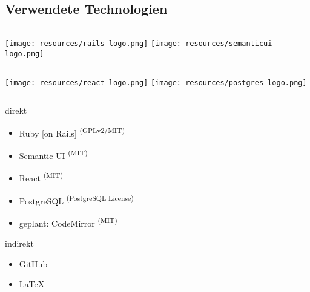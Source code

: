 \subsection{Verwendete Technologien}

\begin{frame}{\insertsectionhead}{\insertsubsectionhead}
  \begin{columns}
    \centering
    \texttt{[image: resources/rails-logo.png]}
    \centering
    \texttt{[image: resources/semanticui-logo.png]}
  \end{columns}
  \vfill
  \begin{columns}
    \centering
    \texttt{[image: resources/react-logo.png]}
    \centering
    \texttt{[image: resources/postgres-logo.png]}
  \end{columns}
\end{frame}

\begin{frame}{\insertsectionhead}{\insertsubsectionhead}
  \begin{block}{direkt}
    \begin{itemize}
      \item Ruby [on Rails] \textsuperscript{(GPLv2/MIT)}
      \item Semantic UI \textsuperscript{(MIT)}
      \item React \textsuperscript{(MIT)}
      \item PostgreSQL \textsuperscript{(PostgreSQL License)}
      \item geplant: CodeMirror \textsuperscript{(MIT)}
    \end{itemize}
  \end{block}
  \pause
  \begin{block}{indirekt}
    \begin{itemize}
      \item GitHub
      \item \LaTeX
    \end{itemize}
  \end{block}
\end{frame}
